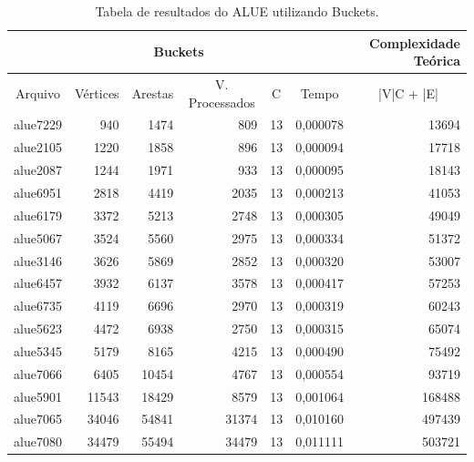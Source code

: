 \documentclass[
	12pt,				%
	oneside,			%
	a4paper,			%
	english,			%
	french,				%
	spanish,			%
	brazil,				%
	]{abntex2}
\begin{document}
\begin{table}[H]
  \centering    
  \begin{tabular}{|c|r|r|r|r|r|r|}
    \toprule
    \multicolumn{6}{|c|}{\cellcolor{gray!25}\textbf{Buckets}} & \cellcolor{gray!25}\textbf{Complexidade Teórica}\\
    \midrule
    \multicolumn{1}{|c|}{\cellcolor{gray!10}Arquivo} & \multicolumn{1}{|c|}{\cellcolor{gray!10}Vértices} & \multicolumn{1}{|c|}{\cellcolor{gray!10}Arestas} & \multicolumn{1}{|c|}{\cellcolor{gray!10}V. Processados} & \multicolumn{1}{|c|}{\cellcolor{gray!10}C} &
    \multicolumn{1}{|c|}{\cellcolor{gray!10}Tempo} & \multicolumn{1}{|c|}{\cellcolor{gray!10}|V|C + |E|}\\
    \hline
    alue7229	&	940	&	1474	&	809	&	13	&	0,000078	&	13694	\\
    \hline
    alue2105	&	1220	&	1858	&	896	&	13	&	0,000094	&	17718	\\
    \hline
    alue2087	&	1244	&	1971	&	933	&	13	&	0,000095	&	18143	\\
    \hline
    alue6951	&	2818	&	4419	&	2035	&	13	&	0,000213	&	41053	\\
    \hline
    alue6179	&	3372	&	5213	&	2748	&	13	&	0,000305	&	49049	\\
    \hline
    alue5067	&	3524	&	5560	&	2975	&	13	&	0,000334	&	51372	\\
    \hline
    alue3146	&	3626	&	5869	&	2852	&	13	&	0,000320	&	53007	\\
    \hline
    alue6457	&	3932	&	6137	&	3578	&	13	&	0,000417	&	57253	\\
    \hline
    alue6735	&	4119	&	6696	&	2970	&	13	&	0,000319	&	60243	\\
    \hline
    alue5623	&	4472	&	6938	&	2750	&	13	&	0,000315	&	65074	\\
    \hline
    alue5345	&	5179	&	8165	&	4215	&	13	&	0,000490	&	75492	\\
    \hline
    alue7066	&	6405	&	10454	&	4767	&	13	&	0,000554	&	93719	\\
    \hline
    alue5901	&	11543	&	18429	&	8579	&	13	&	0,001064	&	168488	\\
    \hline
    alue7065	&	34046	&	54841	&	31374	&	13	&	0,010160	&	497439	\\
    \hline
    alue7080	&	34479	&	55494	&	34479	&	13	&	0,011111	&	503721	\\
    \hline
  \end{tabular}
  \caption{Tabela de resultados do ALUE utilizando Buckets.}  
  \label{tab:AlueBuckets}
\end{table}
\end{document}
